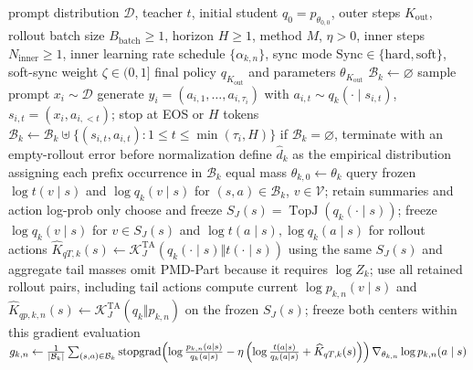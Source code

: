 \begin{algorithm}[ht]
\caption{Tail-aware OPD outer--inner optimization\\{\small\textit{Semantics: 冻结 outer rollout，以 Tail-aware KL 中心运行 Mean、BPO 或 MDPO，再同步并重新 rollout}}}
\begin{algorithmic}[1]
\Require prompt distribution $\mathcal D$, teacher $t$, initial student $q_0=p_{\theta_{0,0}}$, outer steps $K_{\mathrm{out}}$, rollout batch size $B_{\mathrm{batch}}\ge1$, horizon $H\ge1$, method $M$, $\eta>0$, inner steps $N_{\mathrm{inner}}\ge1$, inner learning rate schedule $\{\alpha_{k,n}\}$, sync mode $\mathrm{Sync}\in\{\mathrm{hard},\mathrm{soft}\}$, soft-sync weight $\zeta\in(0,1]$
\Ensure final policy $q_{K_{\mathrm{out}}}$ and parameters $\theta_{K_{\mathrm{out}}}$
    \State $\mathcal B_k\gets\varnothing$ 
        \State sample prompt $x_i\sim\mathcal D$
        \State generate $y_i=(a_{i,1},\ldots,a_{i,\tau_i})$ with $a_{i,t}\sim q_k(\cdot\mid s_{i,t})$, $s_{i,t}=(x_i,a_{i,<t})$; stop at EOS or $H$ tokens
        \State $\mathcal B_k\gets\mathcal B_k\mathbin{\uplus}\{(s_{i,t},a_{i,t}):1\le t\le\min(\tau_i,H)\}$
    \EndFor
    \State if $\mathcal B_k=\varnothing$, terminate with an empty-rollout error before normalization
    \State define $\widehat d_k$ as the empirical distribution assigning each prefix occurrence in $\mathcal B_k$ equal mass
    \State $\theta_{k,0}\gets\theta_k$ 
    \State query frozen $\log t(v\mid s)$ and $\log q_k(v\mid s)$ for $(s,a)\in\mathcal B_k$, $v\in\mathcal V$; retain summaries and action log-prob only
    \State choose and freeze $S_J(s)=\operatorname{TopJ}(q_k(\cdot\mid s))$; freeze $\log q_k(v\mid s)$ for $v\in S_J(s)$ and $\log t(a\mid s),\log q_k(a\mid s)$ for rollout actions
    \State $\widehat K_{qT,k}(s)\gets\mathcal K_J^{\mathrm{TA}}(q_k(\cdot\mid s)\Vert t(\cdot\mid s))$ using the same $S_J(s)$ and aggregate tail masses
    \State omit PMD-Part because it requires $\log Z_k$; use all retained rollout pairs, including tail actions
        \State compute current $\log p_{k,n}(v\mid s)$ and $\widehat K_{qp,k,n}(s)\gets\mathcal K_J^{\mathrm{TA}}(q_k\Vert p_{k,n})$ on the frozen $S_J(s)$; freeze both centers within this gradient evaluation
            \State $g_{k,n}\gets\frac1{|\mathcal B_k|}\sum_{(s,a)\in\mathcal B_k}\operatorname{stopgrad}\!\left(\log\frac{p_{k,n}(a\mid s)}{q_k(a\mid s)}-\eta\left(\log\frac{t(a\mid s)}{q_k(a\mid s)}+\widehat K_{qT,k}(s)\right)\right)\nabla_{\theta_{k,n}}\log p_{k,n}(a\mid s)$

\end{algorithmic}
\end{algorithm}
